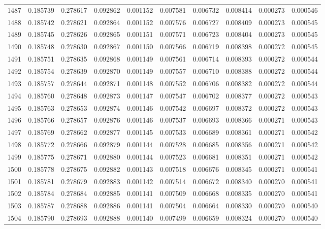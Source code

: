 \begin{tabular}{lrrrrrrrrr}
1487 & 0.185739 & 0.278617 & 0.092862 & 0.001152 & 0.007581 & 0.006732 & 0.008414 & 0.000273 & 0.000546 \\
1488 & 0.185742 & 0.278621 & 0.092864 & 0.001152 & 0.007576 & 0.006727 & 0.008409 & 0.000273 & 0.000545 \\
1489 & 0.185745 & 0.278626 & 0.092865 & 0.001151 & 0.007571 & 0.006723 & 0.008404 & 0.000273 & 0.000545 \\
1490 & 0.185748 & 0.278630 & 0.092867 & 0.001150 & 0.007566 & 0.006719 & 0.008398 & 0.000272 & 0.000545 \\
1491 & 0.185751 & 0.278635 & 0.092868 & 0.001149 & 0.007561 & 0.006714 & 0.008393 & 0.000272 & 0.000544 \\
1492 & 0.185754 & 0.278639 & 0.092870 & 0.001149 & 0.007557 & 0.006710 & 0.008388 & 0.000272 & 0.000544 \\
1493 & 0.185757 & 0.278644 & 0.092871 & 0.001148 & 0.007552 & 0.006706 & 0.008382 & 0.000272 & 0.000544 \\
1494 & 0.185760 & 0.278648 & 0.092873 & 0.001147 & 0.007547 & 0.006702 & 0.008377 & 0.000272 & 0.000543 \\
1495 & 0.185763 & 0.278653 & 0.092874 & 0.001146 & 0.007542 & 0.006697 & 0.008372 & 0.000272 & 0.000543 \\
1496 & 0.185766 & 0.278657 & 0.092876 & 0.001146 & 0.007537 & 0.006693 & 0.008366 & 0.000271 & 0.000543 \\
1497 & 0.185769 & 0.278662 & 0.092877 & 0.001145 & 0.007533 & 0.006689 & 0.008361 & 0.000271 & 0.000542 \\
1498 & 0.185772 & 0.278666 & 0.092879 & 0.001144 & 0.007528 & 0.006685 & 0.008356 & 0.000271 & 0.000542 \\
1499 & 0.185775 & 0.278671 & 0.092880 & 0.001144 & 0.007523 & 0.006681 & 0.008351 & 0.000271 & 0.000542 \\
1500 & 0.185778 & 0.278675 & 0.092882 & 0.001143 & 0.007518 & 0.006676 & 0.008345 & 0.000271 & 0.000541 \\
1501 & 0.185781 & 0.278679 & 0.092883 & 0.001142 & 0.007514 & 0.006672 & 0.008340 & 0.000270 & 0.000541 \\
1502 & 0.185784 & 0.278684 & 0.092885 & 0.001141 & 0.007509 & 0.006668 & 0.008335 & 0.000270 & 0.000541 \\
1503 & 0.185787 & 0.278688 & 0.092886 & 0.001141 & 0.007504 & 0.006664 & 0.008330 & 0.000270 & 0.000540 \\
1504 & 0.185790 & 0.278693 & 0.092888 & 0.001140 & 0.007499 & 0.006659 & 0.008324 & 0.000270 & 0.000540 \\

\end{tabular}
